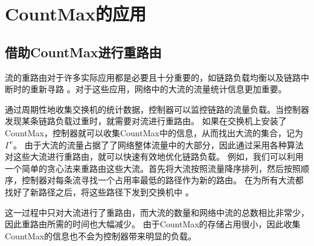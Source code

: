 \chapter{CountMax的应用}


\section{借助CountMax进行重路由}\label{sec:flowrerouting}
流的重路由对于许多实际应用都是必要且十分重要的，如链路负载均衡以及链路中断时的重新寻路\cite{xu2017incremental}
。对于这些应用，网络中的大流的流量统计信息更加重要\cite{xu2017scalable}。

通过周期性地收集交换机的统计数据，控制器可以监控链路的流量负载。当控制器发现某条链路负载过重时，就需要对流进行重路由。
如果在交换机上安装了CountMax，控制器就可以收集CountMax中的信息，从而找出大流的集合，记为 $\Gamma^e$。
由于大流的流量占据了了网络整体流量中的大部分，因此通过采用各种算法对这些大流进行重路由，就可以快速有效地优化链路负载。
例如，我们可以利用一个简单的贪心法来重路由这些大流。首先将大流按照流量降序排列，然后按照顺序，控制器对每条流寻找一个占用率最低的路径作为新的路由。
在为所有大流都找好了新路径之后，将这些路径下发到交换机中\cite{jin2014dynamic} \cite{xu2017joint}。

这一过程中只对大流进行了重路由，而大流的数量和网络中流的总数相比非常少，因此重路由所需的时间也大幅减少。
由于CountMax的存储占用很小，因此收集CountMax的信息也不会为控制器带来明显的负载。


